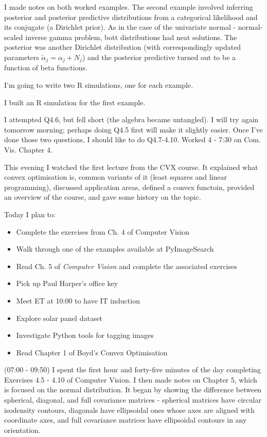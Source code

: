 \documentclass[idxtotoc,hyperref,openany]{labbook} %
\begin{document}
I made notes on both worked examples. The second example involved inferring posterior and posterior predictive distributions from a categorical likelihood and its conjugate (a Dirichlet prior). As in the case of the univariate normal - normal-scaled inverse gamma problem, bott distributions had neat solutions. The posterior was another Dirichlet distribution (with correspondingly updated parameters $\tilde{\alpha}_j = \alpha_j + N_j$) and the posterior predictive turned out to be a function of beta functions.

I'm going to write two R simulations, one for each example.

I built an R simulation for the first example.

I attempted Q4.6, but fell short (the algebra became untangled). I will try again tomorrow morning; perhaps doing Q4.5 first will make it slightly easier. Once I've done those two questions, I should like to do Q4.7-4.10.
Worked 4 - 7:30 on Com. Vis. Chapter 4.

This evening I watched the first lecture from the CVX course. It explained what convex optimisation is, common variants of it (least squares and linear programming), discussed application areas, defined a convex functoin, provided an overview of the course, and gave some history on the topic.




Today I plan to:
\begin{itemize}
	\item Complete the exercises from Ch. 4 of Computer Vision
	\item Walk through one of the examples available at PyImageSearch
	\item Read Ch. 5 of \emph{Computer Vision} and complete the associated exercises
	\item Pick up Paul Harper's office key
	\item Meet ET at 10:00 to have IT induction
	\item Explore solar panel dataset
	\item Investigate Python tools for tagging images
	\item Read Chapter 1 of Boyd's Convex Optimisation
\end{itemize}

(07:00 - 09:50) 
I spent the first hour and forty-five minutes of the day completing Exercises 4.5 - 4.10 of Computer Vision. I then made notes on Chapter 5, which is focused on the normal distribution. It began by showing the difference between spherical, diagonal, and full covariance matrices - spherical matrices have circular isodensity contours, diagonals have ellipsoidal ones whose axes are aligned with coordinate axes, and full covariance matrices have ellipsoidal contours in any orientation.
\end{document}
